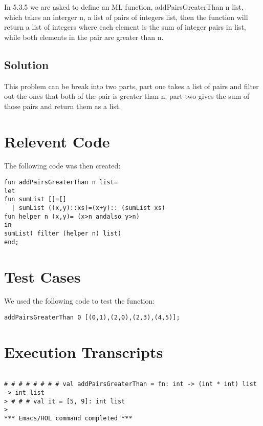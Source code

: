 \documentclass{report}
\begin{document}
In 5.3.5 we are asked to define an ML function, addPairsGreaterThan n
list, which takes an interger n, a list of pairs of integers list,
then the function will return a list of integers where each element is
the sum of integer pairs in list, while both elements in the pair are
greater than n.

\subsection{Solution}
\label{sec:solution}

This problem can be break into two parts, part one takes a list of
pairs and filter out the ones that both of the pair is greater than n.
part two gives the sum of those pairs and return them as a list.

\section{Relevent Code}
\label{sec:relevent-code-2}

The following code was then created:
\begin{lstlisting}[frame=TRBL]
fun addPairsGreaterThan n list=
let
fun sumList []=[]
  | sumList ((x,y)::xs)=(x+y):: (sumList xs)
fun helper n (x,y)= (x>n andalso y>n)
in
sumList( filter (helper n) list)
end;
\end{lstlisting}


\section{Test Cases}
\label{sec:test-cases-5}
We used the following code to test the function:
\begin{lstlisting}[frame=TRBL]
addPairsGreaterThan 0 [(0,1),(2,0),(2,3),(4,5)];
\end{lstlisting}

\section{Execution Transcripts}
\label{sec:exec-transcr-2}


\setcounter{sessioncount}{0}
\begin{session}
  \begin{scriptsize}
\begin{verbatim}
 
# # # # # # # # val addPairsGreaterThan = fn: int -> (int * int) list -> int list
> # # # val it = [5, 9]: int list
> 
*** Emacs/HOL command completed ***
\end{verbatim}
  \end{scriptsize}
\end{session}
\end{document}
